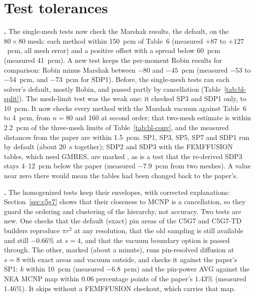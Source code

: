 \section{Test tolerances}
\label{sec:tests}

\textbf{.} The
single-mesh tests now check the Marshak results, the default, on the
$80 \times 80$ mesh: each method within 150~pcm of Table~6 (measured $+87$ to
$+127$~pcm, all mesh error) and a positive offset with a spread below 60~pcm
(measured 41~pcm). A new test keeps the per-moment Robin results for
comparison: Robin minus Marshak between $-80$ and $-45$~pcm (measured $-53$
to $-54$~pcm, and $-73$~pcm for SDP1). Before, the single-mesh tests ran each
solver's default, mostly Robin, and passed partly by cancellation
(Table~\ref{tab:bl-split}). The mesh-limit test was the
weak one: it checked SP3 and SDP1 only, to 10~pcm. It now checks every
method with the Marshak vacuum against Table~6 to 4~pcm, from $n = 80$ and
160 at second order; that two-mesh estimate is within 2.2~pcm of the
three-mesh limits of Table~\ref{tab:bl-conv}, and the measured distances from
the paper are within 1.5~pcm. SP1, SP3, SP5, SP7 and SDP1 run by default
(about 20~s together); SDP2 and SDP3 with the FEMFFUSION tables, which need
GMRES, are marked , as is a test that the re-derived SDP3 stays
4--12~pcm below the paper (measured $-7.9$~pcm from two meshes). A value
near zero there would mean the tables had been changed back to the paper's.

\textbf{.} The homogenized tests keep
their envelopes, with corrected explanations: Section~\ref{sec:c5g7} shows
that their closeness to MCNP is a cancellation, so they guard the ordering
and clustering of the hierarchy, not accuracy. Two tests are new. One checks
that the default (exact) pin areas of the C5G7 and C5G7-TD builders reproduce
$\pi r^2$ at any resolution, that the old sampling is still available and
still $-0.66$\% at $s = 4$, and that the vacuum boundary option is passed
through. The other, marked
 (about a minute), runs pin-resolved diffusion at $s = 8$ with
exact areas and vacuum outside, and checks it against the paper's SP1: $k$
within 10~pcm (measured $-6.8$~pcm) and the pin-power AVG against the NEA
MCNP map within 0.06 percentage points of the paper's 1.43\% (measured
1.46\%). It skips without a FEMFFUSION checkout, which carries that map.
